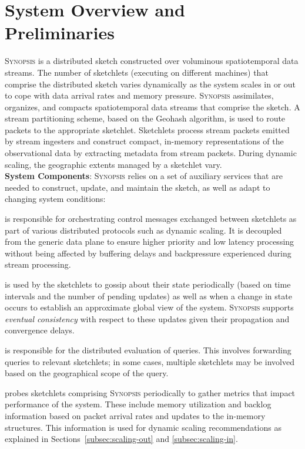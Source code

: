\documentclass[9pt,journal,compsoc]{IEEEtran}
\begin{document}
\section{System Overview and Preliminaries}
\label{sec:system}
\textsc{Synopsis} is a distributed sketch constructed over voluminous spatiotemporal data streams.
The number of sketchlets (executing on different machines) that comprise the distributed sketch varies dynamically as the system scales in or out to cope with data arrival rates and memory pressure.
\textsc{Synopsis} assimilates, organizes, and compacts spatiotemporal data streams that comprise the sketch.
A stream partitioning scheme, based on the Geohash algorithm, is used to route packets to the appropriate sketchlet.
Sketchlets process stream packets emitted by stream ingesters and construct compact, in-memory representations of the observational data by extracting metadata from stream packets.
During dynamic scaling, the geographic extents managed by a sketchlet vary.
%
\vspace{0.7em}\\
%
\textbf{System Components}:
\textsc{Synopsis} relies on a set of auxiliary services that are needed to construct, update, and maintain the sketch, as well as adapt to changing system conditions:
\begin{description}[leftmargin=*]
\item[Control plane] is responsible for orchestrating control messages exchanged between sketchlets as part of various distributed protocols such as dynamic scaling.
    It is decoupled from the generic data plane to ensure higher priority and low latency processing without being affected by buffering delays and backpressure experienced during stream processing.

\item[Gossip subsystem] is used by the sketchlets to gossip about their state periodically (based on time intervals and the number of pending updates) as well as when a change in state occurs to establish an approximate global view of the system. \textsc{Synopsis} supports \emph{eventual consistency} with respect to these updates given their propagation and convergence delays.

\item[Querying subsystem] is responsible for the distributed evaluation of queries.
    This involves forwarding queries to relevant sketchlets; in some cases, multiple sketchlets may be involved based on the geographical scope of the query.

\item[Monitoring subsystem] probes sketchlets comprising \textsc{Synopsis} periodically to gather metrics that impact performance of the system.
    These include memory utilization and backlog information based on packet arrival rates and updates to the in-memory structures.
    This information is used for dynamic scaling recommendations as explained in Sections~\ref{subsec:scaling-out} and \ref{subsec:scaling-in}.
\end{description}
\end{document}
